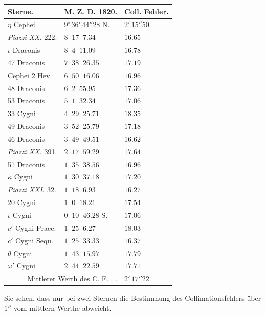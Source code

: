 \begin{center}
\begin{tabular}{l|l|l}
Sterne. & M. Z. D. 1820. & Coll. Fehler. \\
\hline
$\eta$ Cephei & $9^\circ\,36'\,44''28$ N. & $2'\,15''50$ \\
\emph{Piazzi XX.} 222. & $8\;\;17\;\;7.34$ & $16.65$ \\
$\iota$ Draconis & $8\;\;4\;\;11.09$ & $16.78$ \\
47 Draconis & $7\;\;38\;\;26.35$ & $17.19$ \\
Cephei 2 Hev. & $6\;\;50\;\;16.06$ & $16.96$ \\
48 Draconis & $6\;\;2\;\;55.95$ & $17.36$ \\
53 Draconis & $5\;\;1\;\;32.34$ & $17.06$ \\
33 Cygni & $4\;\;29\;\;25.71$ & $18.35$ \\
49 Draconis & $3\;\;52\;\;25.79$ & $17.18$ \\
46 Draconis & $3\;\;49\;\;49.51$ & $16.62$ \\
\emph{Piazzi XX.} 391. & $2\;\;17\;\;59.29$ & $17.64$ \\
51 Draconis & $1\;\;35\;\;38.56$ & $16.96$ \\
$\kappa$ Cygni & $1\;\;30\;\;37.18$ & $17.20$ \\
\emph{Piazzi XXI.} 32. & $1\;\;18\;\;6.93$ & $16.27$ \\
20 Cygni & $1\;\;0\;\;18.21$ & $17.54$ \\
$\iota$ Cygni & $0\;\;10\;\;46.28$ S. & $17.06$ \\
$c'$ Cygni Praec. & $1\;\;25\;\;6.27$ & $18.03$ \\
$c'$ Cygni Sequ. & $1\;\;25\;\;33.33$ & $16.37$ \\
$\theta$ Cygni & $1\;\;43\;\;15.97$ & $17.79$ \\
$\omega'$ Cygni & $2\;\;44\;\;22.59$ & $17.71$ \\
\multicolumn{2}{r|}{Mittlerer Werth des C. F. . .} & $2'\,17''22$ \\
\end{tabular}
\end{center}

Sie sehen, dass nur bei zwei Sternen die Bestimmung des Collimationsfehlers über $1''$
vom mittlern Werthe abweicht.
\clearpage
\endgroup
